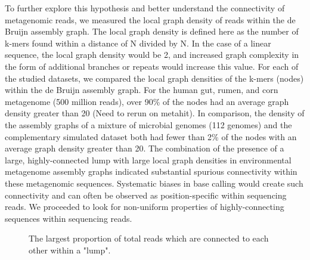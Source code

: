 \documentclass[11pt]{article} %
\begin{document}
To further explore this hypothesis and better understand the connectivity of metagenomic reads, we measured the local graph density of reads within the de Bruijn assembly graph. The local graph density is defined here as the number of k-mers found within a distance of N divided by N.  In the case of a linear sequence, the local graph density would be 2, and increased graph complexity in the form of additional branches or repeats would increase this value. For each of the studied datasets, we compared the local graph densities of the k-mers (nodes) within the de Bruijn assembly graph.  For the human gut, rumen, and corn metagenome (500 million reads), over 90\% of the nodes had an average graph density greater than 20 (Need to rerun on metahit).  In comparison, the density of the assembly graphs of a mixture of microbial genomes (112 genomes) and the complementary simulated dataset both had fewer than 2\% of the nodes with an average graph density greater than 20.  The combination of the presence of a large, highly-connected lump with large local graph densities in environmental metagenome assembly graphs indicated substantial spurious connectivity within these metagenomic sequences.  Systematic biases in base calling would create such connectivity and can often be observed as position-specific within sequencing reads.  We proceeded to look for non-uniform properties of highly-connecting sequences within sequencing reads.

\begin{figure}
\caption{The largest proportion of total reads which are connected to each other within a "lump".}
\end{figure}
\end{document}
